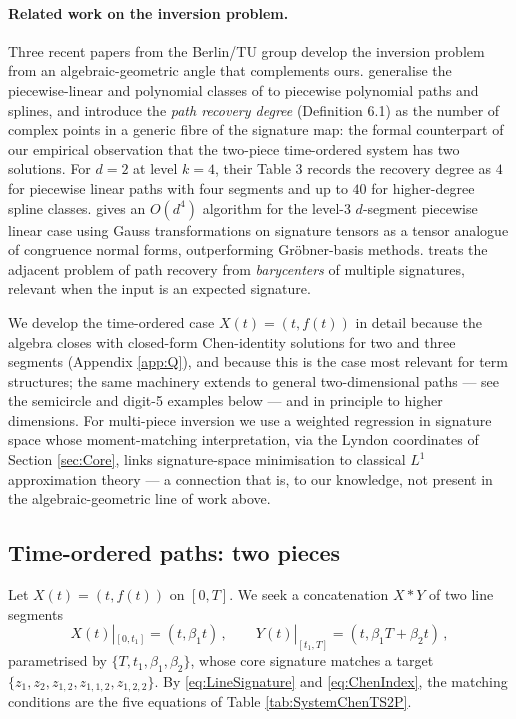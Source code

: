 \documentclass[11pt,english]{article}
\begin{document}
\paragraph{Related work on the inversion problem.}
Three recent papers from the Berlin/TU group develop the inversion
problem from an algebraic-geometric angle that complements ours. \cite{splines}
generalise the piecewise-linear and polynomial classes of \cite{varieties}
to piecewise polynomial paths and splines, and introduce the \emph{path
recovery degree} (Definition 6.1) as the number of complex points
in a generic fibre of the signature map: the formal counterpart of
our empirical observation that the two-piece time-ordered system has
two solutions. For $d=2$ at level $k=4$, their Table 3 records the
recovery degree as $4$ for piecewise linear paths with four segments
and up to $40$ for higher-degree spline classes. \cite{tensorlearning}
gives an $O(d^{4})$ algorithm for the level-3 $d$-segment piecewise
linear case using Gauss transformations on signature tensors as a
tensor analogue of congruence normal forms, outperforming Gröbner-basis
methods. \cite{barycenters} treats the adjacent problem of path recovery
from \emph{barycenters} of multiple signatures, relevant when the
input is an expected signature.

We develop the time-ordered case $X(t)=(t,f(t))$ in detail because
the algebra closes with closed-form Chen-identity solutions for two
and three segments (Appendix \ref{app:Q}), and because this is the
case most relevant for term structures; the same machinery extends
to general two-dimensional paths --- see the semicircle and digit-5
examples below --- and in principle to higher dimensions. For multi-piece
inversion we use a weighted regression in signature space whose moment-matching
interpretation, via the Lyndon coordinates of Section \ref{sec:Core},
links signature-space minimisation to classical $L^{1}$ approximation
theory --- a connection that is, to our knowledge, not present in
the algebraic-geometric line of work above.

\subsection{Time-ordered paths: two pieces}

Let $X(t)=(t,f(t))$ on $[0,T]$. We seek a concatenation $X*Y$ of
two line segments
\[
X(t)|_{[0,t_{1}]}=(t,\beta_{1}t)\,,\qquad Y(t)|_{[t_{1},T]}=(t,\beta_{1}T+\beta_{2}t)\,,
\]
parametrised by $\{T,t_{1},\beta_{1},\beta_{2}\}$, whose core signature
matches a target $\{z_{1},z_{2},z_{1,2},z_{1,1,2},z_{1,2,2}\}$. By
\eqref{eq:LineSignature} and \eqref{eq:ChenIndex}, the matching conditions
are the five equations of Table \ref{tab:SystemChenTS2P}.
\end{document}
